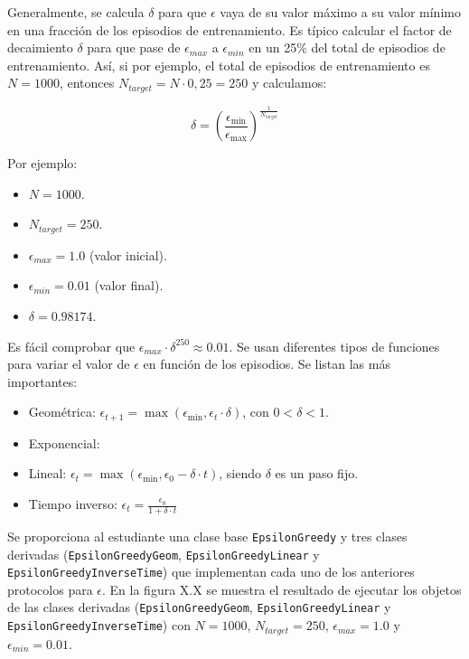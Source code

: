 \documentclass{article}
\begin{document}
Generalmente, se calcula $\delta$ para que $\epsilon$ vaya de su valor máximo a su valor mínimo en una fracción de los episodios de entrenamiento. Es típico calcular el factor de decaimiento $\delta$ para que pase de $\epsilon_{max}$ a $\epsilon_{min}$ en un 25\% del total de episodios de entrenamiento. Así, si por ejemplo, el total de episodios de entrenamiento es $N=1000$, entonces $N_{target}=N\cdot 0,25=250$ y calculamos:

$$\delta = \left(\frac{\epsilon_{\text{min}}}{\epsilon_{\text{max}}} \right)^{\frac{1}{N_{target}}}$$

Por ejemplo:
\begin{itemize}
    \item $N=1000$.
    \item $N_{target}=250$.
    \item $\epsilon_{max}=1.0$ (valor inicial).
    \item $\epsilon_{min}=0.01$ (valor final).
    \item $\delta=0.98174$.
\end{itemize}
Es fácil comprobar que $\epsilon_{max}\cdot \delta^{250}\approx 0.01$. Se usan diferentes tipos de funciones para variar el valor de $\epsilon$ en función de los episodios. Se listan las más importantes:
\begin{itemize}
    \item Geométrica: $\epsilon_{t+1} = \max(\epsilon_{\min}, \epsilon_t \cdot \delta)$, con $0 < \delta < 1$. 
    \item Exponencial: 
    \item Lineal: $\epsilon_t = \max(\epsilon_{\min}, \epsilon_0 - \delta \cdot t)$, siendo $\delta$ es un paso fijo. 
    \item Tiempo inverso: $\epsilon_t = \frac{\epsilon_0}{1 + \delta \cdot t}$ 
\end{itemize}

Se proporciona al estudiante una clase base \texttt{EpsilonGreedy} y tres clases derivadas (\texttt{EpsilonGreedyGeom}, \texttt{EpsilonGreedyLinear} y \texttt{EpsilonGreedyInverseTime}) que implementan cada uno de los anteriores protocolos para $\epsilon$. En la figura X.X se muestra el resultado de ejecutar los objetos de las clases derivadas (\texttt{EpsilonGreedyGeom}, \texttt{EpsilonGreedyLinear} y \texttt{EpsilonGreedyInverseTime}) con $N=1000$, $N_{target}=250$, $\epsilon_{max}=1.0$ y $\epsilon_{min}=0.01$.
\end{document}
